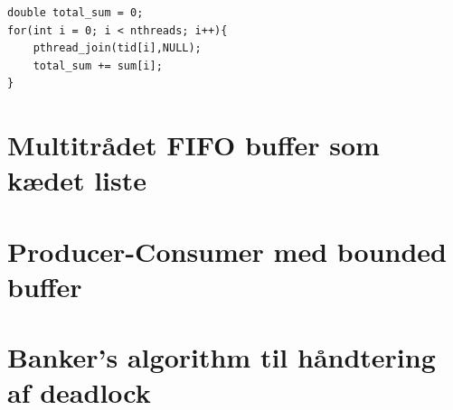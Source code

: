 \documentclass[danish]{report}
\begin{document}
\begin{lstlisting}    
double total_sum = 0;
for(int i = 0; i < nthreads; i++){
    pthread_join(tid[i],NULL);
    total_sum += sum[i];
}
\end{lstlisting}

\chapter{Multitrådet FIFO buffer som kædet liste}
\chapter{Producer-Consumer med bounded buffer}
\chapter{Banker’s algorithm til håndtering af deadlock}
\end{document}
